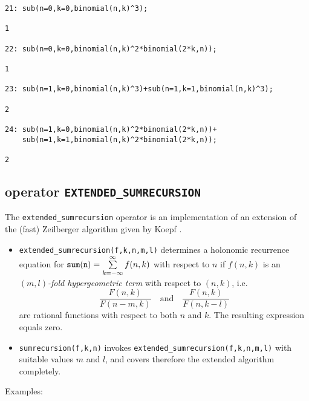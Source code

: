 {\small
\begin{verbatim}
21: sub(n=0,k=0,binomial(n,k)^3);

1

22: sub(n=0,k=0,binomial(n,k)^2*binomial(2*k,n));

1

23: sub(n=1,k=0,binomial(n,k)^3)+sub(n=1,k=1,binomial(n,k)^3);

2

24: sub(n=1,k=0,binomial(n,k)^2*binomial(2*k,n))+
    sub(n=1,k=1,binomial(n,k)^2*binomial(2*k,n));

2
\end{verbatim}
}\noindent

\subsection{\REDUCE{} operator {\tt EXTENDED\_SUMRECURSION}}
\label{sec:EXTENDED_SUMRECURSION}

The {\tt extended\_sumrecursion} operator is an implementation
of an extension of the (fast) Zeilberger algorithm given by Koepf
\cite{Koepf:94b}.
\begin{itemize}
\item
{\tt extended\_sumrecursion(f,k,n,m,l)} determines a holonomic recurrence
equation for ${\tt sum(n)} =\sum\limits_{k=-\infty}^\infty f(n,k)$
with respect to $n$ if $f(n,k)$ is an \textsl{$(m,l)$-fold hypergeometric term}
with respect to $(n,k)$, i.e.
\[
\frac{F(n,k)}{F(n-m,k)}
\quad
\mbox{and}
\quad
\frac{F(n,k)}{F(n,k-l)}
\]
are rational functions with respect to both $n$ and $k$.
The resulting expression equals zero.
\item
{\tt sumrecursion(f,k,n)} invokes {\tt extended\_sumrecursion(f,k,n,m,l)}
with suitable values $m$ and $l$, and covers therefore the extended
algorithm completely.
\end{itemize}
Examples:

